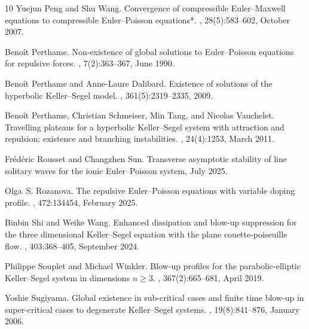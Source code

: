 \documentclass[11pt]{article}
\theoremstyle{plain}
\theoremstyle{definition}
\theoremstyle{remark}
\numberwithin{equation}{section}
\begin{document}
\begin{thebibliography}{10}
Yuejun Peng and Shu Wang.
\newblock Convergence of compressible Euler--Maxwell equations to compressible Euler--Poisson equations*.
, 28(5):583--602, October 2007.

Beno\^{i}t Perthame.
\newblock Non-existence of global solutions to Euler--Poisson equations for repulsive forces.
, 7(2):363--367, June 1990.

Beno\^{i}t Perthame and Anne-Laure Dalibard.
\newblock Existence of solutions of the hyperbolic Keller--Segel model.
, 361(5):2319--2335, 2009.

Beno\^{i}t Perthame, Christian Schmeiser, Min Tang, and Nicolas Vauchelet.
\newblock Travelling plateaus for a hyperbolic Keller--Segel system with attraction and repulsion: existence and branching instabilities.
, 24(4):1253, March 2011.

Frédéric Rousset and Changzhen Sun.
\newblock Transverse asymptotic stability of line solitary waves for the ionic Euler--Poisson system, July 2025.

Olga~S. Rozanova.
\newblock The repulsive Euler--Poisson equations with variable doping profile.
, 472:134454, February 2025.

Binbin Shi and Weike Wang.
\newblock Enhanced dissipation and blow-up suppression for the three dimensional Keller--Segel equation with the plane couette-poiseuille flow.
, 403:368--405, September 2024.

Philippe Souplet and Michael Winkler.
\newblock Blow-up profiles for the parabolic-elliptic Keller--Segel system in dimensions ${n\geq 3}$.
, 367(2):665--681, April 2019.

Yoshie Sugiyama.
\newblock Global existence in sub-critical cases and finite time blow-up in super-critical cases to degenerate Keller--Segel systems.
, 19(8):841--876, January 2006.


\end{thebibliography}
\end{document}
